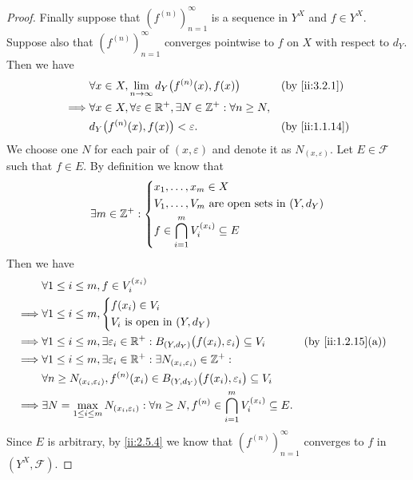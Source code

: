 \begin{proof}
  Finally suppose that \((f^{(n)})_{n = 1}^\infty\) is a sequence in \(Y^X\) and \(f \in Y^X\).
  Suppose also that \((f^{(n)})_{n = 1}^\infty\) converges pointwise to \(f\) on \(X\) with respect to \(d_Y\).
  Then we have
  \begin{align*}
             & \forall x \in X, \lim_{n \to \infty} d_Y\big(f^{(n)}(x), f(x)\big)                    &  & \by{ii:3.2.1}  \\
    \implies & \forall x \in X, \forall \varepsilon \in \R^+, \exists N \in \Z^+ : \forall n \geq N,                  \\
             & d_Y\big(f^{(n)}(x), f(x)\big) < \varepsilon.                                          &  & \by{ii:1.1.14}
  \end{align*}
  We choose one \(N\) for each pair of \((x, \varepsilon)\) and denote it as \(N_{(x, \varepsilon)}\).
  Let \(E \in \mathcal{F}\) such that \(f \in E\).
  By definition we know that
  \[
    \exists m \in \mathbb{Z}^+ : \begin{dcases}
      x_1, \dots, x_m \in X                              \\
      V_1, \dots, V_m \text{ are open sets in } (Y, d_Y) \\
      f \in \bigcap_{i = 1}^m V_i^{(x_i)} \subseteq E
    \end{dcases}
  \]
  Then we have
  \begin{align*}
             & \forall 1 \leq i \leq m, f \in V_i^{(x_i)}                                                                                                                 \\
    \implies & \forall 1 \leq i \leq m, \begin{dcases}
                                          f(x_i) \in V_i \\
                                          V_i \text{ is open in } (Y, d_Y)
                                        \end{dcases}                                                                                                   \\
    \implies & \forall 1 \leq i \leq m, \exists \varepsilon_i \in \R^+ : B_{(Y, d_Y)}\big(f(x_i), \varepsilon_i\big) \subseteq V_i                    &  & \by{ii:1.2.15}[a] \\
    \implies & \forall 1 \leq i \leq m, \exists \varepsilon_i \in \R^+ : \exists N_{(x_i, \varepsilon_i)} \in \Z^+ :                                                      \\
             & \forall n \geq N_{(x_i, \varepsilon_i)}, f^{(n)}(x_i) \in B_{(Y, d_Y)}\big(f(x_i), \varepsilon_i\big) \subseteq V_i                                        \\
    \implies & \exists N = \max_{1 \leq i \leq m} N_{(x_i, \varepsilon_i)} : \forall n \geq N, f^{(n)} \in \bigcap_{i = 1}^m V_i^{(x_i)} \subseteq E.
  \end{align*}
  Since \(E\) is arbitrary, by \cref{ii:2.5.4} we know that \((f^{(n)})_{n = 1}^\infty\) converges to \(f\) in \((Y^X, \mathcal{F})\).
\end{proof}
